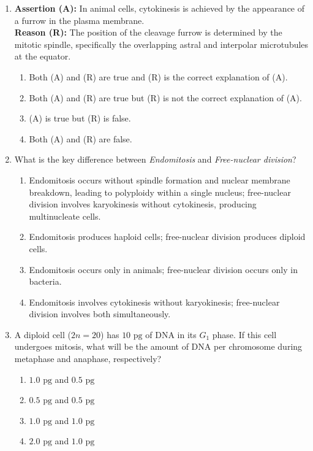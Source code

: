 \documentclass[11pt,a4paper]{article}
\begin{document}
\begin{enumerate}[label=\textbf{\arabic*.}, leftmargin=*]
\item \textbf{Assertion (A):} In animal cells, cytokinesis is achieved by the appearance of a furrow in the plasma membrane.\\
\textbf{Reason (R):} The position of the cleavage furrow is determined by the mitotic spindle, specifically the overlapping astral and interpolar microtubules at the equator.
\begin{enumerate}[label=(\alph*)]
    \item Both (A) and (R) are true and (R) is the correct explanation of (A).
    \item Both (A) and (R) are true but (R) is not the correct explanation of (A).
    \item (A) is true but (R) is false.
    \item Both (A) and (R) are false.
\end{enumerate}

\item What is the key difference between \textit{Endomitosis} and \textit{Free-nuclear division}?
\begin{enumerate}[label=(\alph*)]
    \item Endomitosis occurs without spindle formation and nuclear membrane breakdown, leading to polyploidy within a single nucleus; free-nuclear division involves karyokinesis without cytokinesis, producing multinucleate cells.
    \item Endomitosis produces haploid cells; free-nuclear division produces diploid cells.
    \item Endomitosis occurs only in animals; free-nuclear division occurs only in bacteria.
    \item Endomitosis involves cytokinesis without karyokinesis; free-nuclear division involves both simultaneously.
\end{enumerate}

\item A diploid cell ($2n = 20$) has $10\text{ pg}$ of DNA in its $G_1$ phase. If this cell undergoes mitosis, what will be the amount of DNA per chromosome during metaphase and anaphase, respectively?
\begin{enumerate}[label=(\alph*)]
    \item $1.0\text{ pg}$ and $0.5\text{ pg}$
    \item $0.5\text{ pg}$ and $0.5\text{ pg}$
    \item $1.0\text{ pg}$ and $1.0\text{ pg}$
    \item $2.0\text{ pg}$ and $1.0\text{ pg}$
\end{enumerate}


\end{enumerate}
\end{document}
